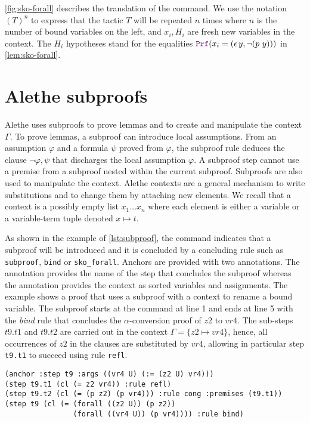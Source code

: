 \cref{fig:sko-forall} describes the translation of the  command. We use the notation $(T)^n$ to express that the tactic $T$ will be repeated $n$ times where $n$ is the number of bound variables on the left, and $x_i, H_i$ are fresh new variables in the context.
The $H_i$ hypotheses stand for the equalities $\prf (x_i = (\epsilon\,y, \neg (p~y)))$ in \cref{lem:sko-forall}.

\section{Alethe subproofs}
\label{app:subproof}

Alethe uses subproofs to prove lemmas and to create and manipulate the context $\Gamma$. To prove lemmas, a subproof can introduce local assumptions.
From an assumption $\varphi$ and a formula $\psi$ proved from $\varphi$, the subproof rule deduces the clause $\neg \varphi, \psi$ that discharges the local assumption $\varphi$.
A subproof step cannot use a premise from a subproof nested within the current subproof. Subproofs are also used to manipulate the context.
Alethe contexts are a general mechanism to write substitutions and to change them by attaching new elements.
We recall that a context is a possibly empty list $x_1 \dots x_n$ where each element is either a variable or a variable-term tuple denoted $x \mapsto t$.

As shown in the example of \cref{lst:subproof}, the  command indicates that a subproof will be introduced and it is concluded by a concluding rule such as \texttt{subproof},
\texttt{bind} or \texttt{sko\_forall}. Anchors are provided with two annotations. The annotation  provides the name of the step that concludes the subproof whereas the annotation  provides the context as sorted variables and assignments. The example shows a proof that uses a subproof with a context to rename a bound variable.
The subproof starts at the  command at line 1 and ends at line 5 with the \emph{bind} rule that concludes the $\alpha$-conversion proof of $z2$ to $vr4$. The sub-steps $t9.t1$ and $t9.t2$ are carried out in the context $\Gamma = \{ z2 \mapsto vr4 \}$, hence, all occurrences of $z2$ in the clauses are substituted by $vr4$, allowing in particular step \texttt{t9.t1} to succeed using rule \texttt{refl}.

\begin{lstlisting}[language=SMT,mathescape=true, caption={Alethe subproof example.}, label={lst:subproof}]
(anchor :step t9 :args ((vr4 U) (:= (z2 U) vr4)))
(step t9.t1 (cl (= z2 vr4)) :rule refl)
(step t9.t2 (cl (= (p z2) (p vr4))) :rule cong :premises (t9.t1))
(step t9 (cl (= (forall ((z2 U)) (p z2))
                (forall ((vr4 U)) (p vr4)))) :rule bind)
\end{lstlisting}


